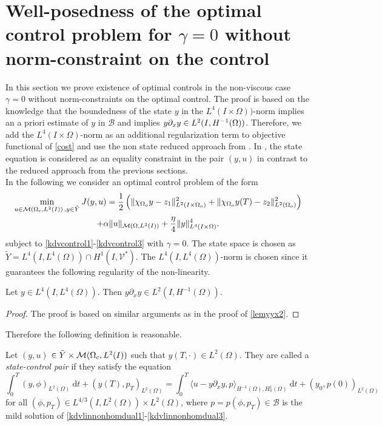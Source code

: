 \section{Well-posedness of the optimal control problem for $\gamma=0$ without norm-constraint on the control}
\label{wp2}
In this section we prove existence of optimal controls in the non-viscous case $\gamma=0$ without norm-constraints on the optimal control. The proof is based on the knowledge that the boundedness of the state $y$ in the $L^4(I\times\Omega))$-norm implies an a priori estimate of $y$ in $\mathcal B$ and implies $y\partial_xy\in\Hm1$. Therefore, we add the $L^4(I\times\Omega)$-norm as an additional regularization term to objective functional of \eqref{cost} and use the non state reduced approach from \cite{lions1985control}. In \cite{lions1985control}, the state equation is considered as an equality constraint in the pair $(y,u)$ in contrast to the reduced approach from the previous sections.\\
In the following we consider an optimal control problem of the form
\begin{multline}
\min_{u \in \M\,,y\in \tilde Y}J(y,u)=\frac{1}{2}\left(\norm{\chi_{\Omega_{o}}y - z_1}_{L^2(I\times \Omega_{o})}^2+\|\chi_{\Omega_{o}}y(T)-z_2\|_{L^2(\Omega_{o})}^2\right) \\+ \alpha \norm{u}_{\mathcal{M}(\Omega, L^{2}(I))} + \frac{\eta}{4} \norm{y}_{L^4(I\times \Omega)}^4.
\label{cost2}
\end{multline}
subject to \eqref{kdvcontrol1}-\eqref{kdvcontrol3} with $\gamma=0$. The state space is chosen as $\tilde Y = L^4(I,L^4(\Omega))\cap H^1(I,\mathcal V^\ast)$.  The $L^4(I,L^4(\Omega))$-norm is chosen since it guarantees the following regularity of the non-linearity.
\begin{lemma}\label{lemyyxL4}
Let $y \in L^4(I,L^4(\Omega))$. Then $y \partial_x y \in L^2(I,H^{-1}(\Omega))$.\\
\end{lemma}
\begin{proof}
{\color{red}The proof is based on similar arguments as in the proof of \cref{lemyyx2}.}
\qquad\end{proof}

Therefore the following definition is reasonable.
\begin{definition}\label{statecontrolpair}
Let $(y,u)$ $\in \tilde Y\times \mathcal{M}(\Omega_c, L^{2}(I))$ such that $y(T,\cdot)\in L^2(\Omega)$. They are called a \textit{state-control pair} if they satisfy the equation
\begin{equation}\label{weakformkdv L4}
\int_0^T(y,\phi)_{L^2(\Omega)}~\mathrm dt+(y(T),p_T)_{L^2(\Omega)}=\int_0^T\langle u-y\partial_xy,p\rangle_{H^{-1}(\Omega),H^1_0(\Omega)}~\mathrm dt+(y_0,p(0))_{L^2(\Omega)}
\end{equation}
for all $(\phi,p_T) \in L^{4/3}(I,L^2(\Omega))\times L^2(\Omega)$, where $p = p(\phi,p_T)\in \mathcal B$ is the mild solution of \eqref{kdvlinnonhomdual1}-\eqref{kdvlinnonhomdual3}.
\end{definition}

